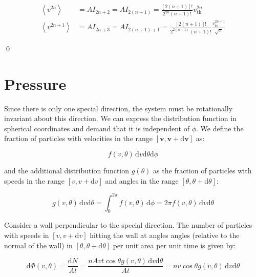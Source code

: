 \documentclass[12pt]{article}
\begin{document}
\begin{correction}
    \begin{equation}
        \begin{split}
            \left\langle v^{2n} \right\rangle &= A I_{2n + 2} = A I_{2(n + 1)} = \frac{[2(n + 1)]!}{2^{2n}(n + 1)!} v_{\text{th}}^{2n} \\
            \left\langle v^{2n + 1} \right\rangle &= A I_{2n + 3} = A I_{2(n + 1) + 1} = \frac{[2(n + 1)]!}{2^{2(n + 1)}(n + 1)!} \frac{v_{\text{th}}^{2n + 1}}{\sqrt{\pi}}
        \end{split}
    \end{equation}
\end{correction}
\qed


\pagebreak
\section*{Pressure}



Since there is only one special direction, the system must be rotationally invariant about this direction. We can express the distribution function in spherical coordinates and demand that it is independent of $\phi$. We define the fraction of particles with velocities in the range $[\mathbf{v}, \mathbf{v} + \mathrm{d}\mathbf{v}]$ as:

\begin{equation}
    f(v, \theta) \, \mathrm{d}v \mathrm{d}\theta \mathrm{d}\phi
\end{equation}

and the additional distribution function $g(\theta)$ as the fraction of particles with speeds in the range $[v, v + \mathrm{d}v]$ and angles in the range $[\theta, \theta + \mathrm{d}\theta]$:

\begin{equation}
    g(v, \theta) \, \mathrm{d}v \mathrm{d}\theta = \int_{0}^{2\pi} f(v, \theta) \, \mathrm{d}\phi = 2\pi f(v, \theta) \, \mathrm{d}v \mathrm{d}\theta
\end{equation}

Consider a wall perpendicular to the special direction. The number of particles with speeds in $[v, v + \mathrm{d}v]$ hitting the wall at angles angles (relative to the normal of the wall) in $[\theta, \theta + \mathrm{d}\theta]$ per unit area per unit time is given by:

\begin{equation}
    \mathrm{d}\Phi(v, \theta) = \frac{\mathrm{d}N}{At} = \frac{nAvt \cos{\theta} g(v, \theta) \, \mathrm{d}v \mathrm{d}\theta}{At} = nv \cos{\theta} g(v, \theta) \, \mathrm{d}v \mathrm{d}\theta
\end{equation}
\end{document}
